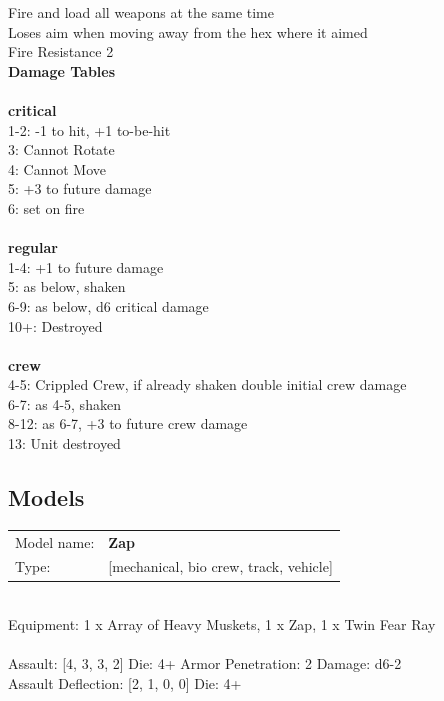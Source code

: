 Fire and load all weapons at the same time\\ 
Loses aim when moving away from the hex where it aimed\\ 
Fire Resistance 2\\ 



{\bf Damage Tables} \\
\ \\ {\bf critical } \\
1-2: -1 to hit, +1 to-be-hit \\
3: Cannot Rotate \\
4: Cannot Move \\
5: +3 to future damage \\
6: set on fire \\
\ \\ {\bf regular } \\
1-4: +1 to future damage \\
5: as below, shaken \\
6-9: as below, d6 critical damage \\
10+: Destroyed \\
\ \\ {\bf crew } \\
4-5: Crippled Crew, if already shaken double initial crew damage \\
6-7: as 4-5, shaken \\
8-12: as 6-7, +3 to future crew damage \\
13: Unit destroyed \\


\clearpage

\subsection{ Models }

\begin{tabular}{ll}
Model name: & {\bf Zap } \\
Type: & [mechanical, bio crew, track, vehicle] \\
\end{tabular}
\ \\
Equipment: 1 x Array of Heavy Muskets, 1 x Zap, 1 x Twin Fear Ray \\
\ \\
Assault: [4, 3, 3, 2] Die: 4+ Armor Penetration: 2 Damage: d6-2 \\
Assault Deflection: [2, 1, 0, 0] Die: 4+\\
\indent  
\ \\

